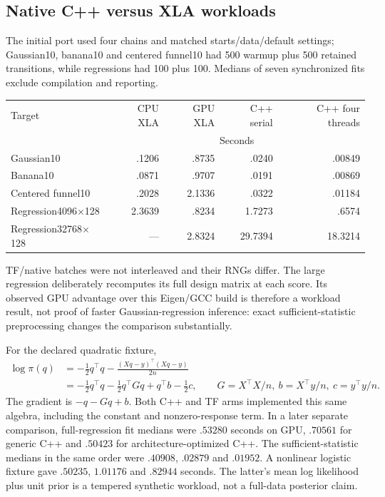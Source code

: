 \subsection{Native C++ versus XLA workloads}

The initial port used four chains and matched starts/data/default settings;
Gaussian10, banana10 and centered funnel10 had 500 warmup plus 500 retained
transitions, while regressions had 100 plus 100. Medians of seven
synchronized fits exclude compilation and reporting.

\begin{center}\small
\begin{tabular}{lrrrr}
\toprule
Target & CPU XLA & GPU XLA & C++ serial & C++ four threads\\
 & \multicolumn{4}{c}{Seconds}\\
\midrule
Gaussian10 & .1206 & .8735 & .0240 & .00849\\
Banana10 & .0871 & .9707 & .0191 & .00869\\
Centered funnel10 & .2028 & 2.1336 & .0322 & .01184\\
Regression4096$\times$128 & 2.3639 & .8234 & 1.7273 & .6574\\
Regression32768$\times$128 & --- & 2.8324 & 29.7394 & 18.3214\\
\bottomrule
\end{tabular}
\end{center}

TF/native batches were not interleaved and their RNGs differ. The large
regression deliberately recomputes its full design matrix at each score.
Its observed GPU advantage over this Eigen/GCC build is therefore a
workload result, not proof of faster Gaussian-regression inference: exact
sufficient-statistic preprocessing changes the comparison substantially.

For the declared quadratic fixture,
\begin{align}
 \log\pi(q)&=-\tfrac12q^\top q-\frac{(Xq-y)^\top(Xq-y)}{2n}\\
 &=-\tfrac12q^\top q-\tfrac12q^\top Gq+q^\top b-\tfrac12c,
 \qquad G=X^\top X/n,\ b=X^\top y/n,\ c=y^\top y/n.
\end{align}
The gradient is $-q-Gq+b$. Both C++ and TF arms implemented this same
algebra, including the constant and nonzero-response term. In a later
separate comparison, full-regression fit medians were $.53280$ seconds on GPU, $.70561$
for generic C++ and $.50423$ for architecture-optimized C++. The
sufficient-statistic medians in the same order were $.40908$, $.02879$
and $.01952$. A nonlinear logistic fixture gave $.50235$, $1.01176$
and $.82944$ seconds. The latter's mean log likelihood plus unit prior
is a tempered synthetic workload, not a full-data posterior claim.

